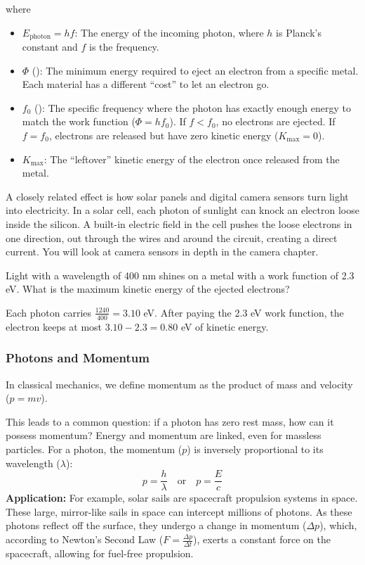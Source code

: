 where
\begin{itemize}
  \item $E_{\text{photon}} = hf$: The energy of the incoming photon, where $h$ is Planck's constant and $f$ is the frequency. 
  \item $\Phi$ (): The minimum energy required to eject an electron from a specific metal. Each material has a different ``cost'' to let an electron go.
  \item $f_0$ (): The specific frequency where the photon has exactly enough energy to match the work function ($\Phi = hf_0$). If $f < f_0$, no electrons are ejected. If $f = f_0$, electrons are released but have zero kinetic energy ($K_{\max} = 0$).
  \item $K_{\max}$: The ``leftover'' kinetic energy of the electron once released from the metal.
\end{itemize}
A closely related effect is how solar panels and digital camera sensors
turn light into electricity. In a solar cell, each photon of sunlight can
knock an electron loose inside the silicon. A built-in electric field in
the cell pushes the loose electrons in one direction, out through the
wires and around the circuit, creating a direct current. You will look at
camera sensors in depth in the camera chapter.

\begin{Exercise}[title={Ejected electrons}, label=ph_kmax]
Light with a wavelength of 400 nm shines on a metal with a work function
of 2.3 eV. What is the maximum kinetic energy of the ejected electrons?
\end{Exercise}
\begin{Answer}[ref=ph_kmax]
Each photon carries $\frac{1240}{400} = 3.10$ eV. After paying the 2.3 eV
work function, the electron keeps at most $3.10 - 2.3 = 0.80$ eV of
kinetic energy.
\end{Answer}
\subsubsection{Photons and Momentum}
In classical mechanics, we define momentum as the product of mass and velocity ($p = mv$). 

This leads to a common question: if a photon has zero rest mass, how can it possess momentum? Energy and momentum are linked, even for massless particles. For a photon, the momentum ($p$) is inversely proportional to its wavelength ($\lambda$):
\begin{equation}
  p = \frac{h}{\lambda} \quad \text{or} \quad p = \frac{E}{c}
  \label{eq:photon_momentum}
\end{equation}
\textbf{Application:}
For example, solar sails are spacecraft propulsion systems in space. These large, mirror-like sails in space can intercept millions of photons. As these photons reflect off the surface, they undergo a change in momentum ($\Delta p$), which, according to Newton's Second Law ($F = \frac{\Delta p}{\Delta t}$), exerts a constant force on the spacecraft, allowing for fuel-free propulsion. 
